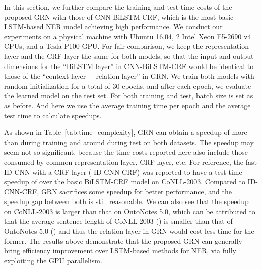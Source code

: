 \documentclass[letterpaper]{article} \usepackage{aaai19}  \usepackage{times}  \usepackage{helvet}  \usepackage{courier}  \usepackage{url}  \usepackage{graphicx}  \usepackage{amsmath}
\newcommand{\ie}{\text{i.e.,}}
\newcommand{\GRN}{GRN}
\begin{document}
In this section, we further compare the training and test time costs of the proposed \GRN{} with those of CNN-BiLSTM-CRF, which is the most basic LSTM-based NER model achieving high performance. We conduct our experiments on a physical machine with Ubuntu 16.04, 2 Intel Xeon E5-2690 v4 CPUs, and a Tesla P100 GPU. For fair comparison, we keep the representation layer and the CRF layer the same for both models, so that the input and output dimensions for the ``BiLSTM layer'' in CNN-BiLSTM-CRF would be identical to those of the ``context layer + relation layer'' in \GRN{}. We train both models with random initialization for a total of 30 epochs, and after each epoch, we evaluate the learned model on the test set. For both training and test, batch size is set as  as before. And here we use the average training time per epoch and the average test time to calculate speedups.

As shown in Table~\ref{tab:time_complexity}, \GRN{} can obtain a speedup of more than  during training and around  during test on both datasets. The speedup may seem not so significant, because the time costs reported here also include those consumed by common representation layer, CRF layer, etc. For reference, the fast ID-CNN with a CRF layer (\ie{} ID-CNN-CRF) \cite{strubell2017fast} was reported to have a test-time speedup of  over the basic BiLSTM-CRF model on CoNLL-2003. Compared to ID-CNN-CRF, \GRN{} sacrifices some speedup for better performance, and the speedup gap between both is still reasonable. We can also see that the speedup on CoNLL-2003 is larger than that on OntoNotes 5.0, which can be attributed to that the average sentence length of CoNLL-2003 () is smaller than that of OntoNotes 5.0 () and thus the relation layer in \GRN{} would cost less time for the former.
The results above demonstrate that the proposed \GRN{} can generally bring efficiency improvement over LSTM-based methods for NER, via fully exploiting the GPU parallelism.

\begin{table}[t!]
  \centering
    \begin{adjustbox}{width=0.75\columnwidth}
    \end{adjustbox}
    \caption{Training/test speedup of \GRN{} compared with CNN-BiLSTM-CRF. }\label{tab:time_complexity}
\end{table}
\end{document}
